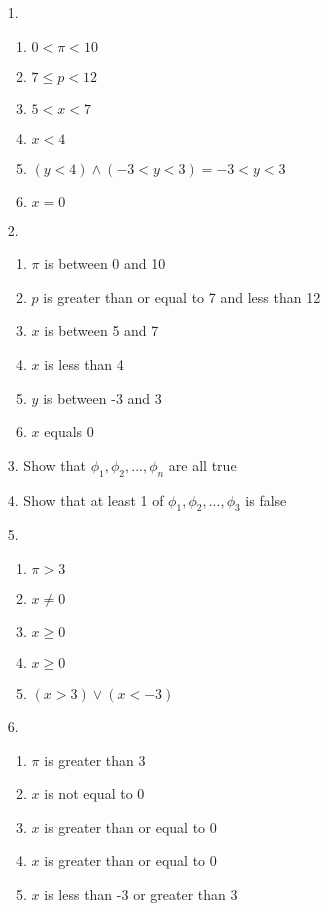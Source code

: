 \documentclass[11pt]{exam}
\author{@dante}
\begin{document}

\begin{enumerate}[leftmargin=0pt]

\item[1.]
\begin{enumerate}[label=(\alph*)]
    \item $0 < \pi < 10$
    \item $7 \leq p < 12$
    \item $5 < x < 7$
    \item $x < 4$
    \item $(y < 4) \land (-3 < y < 3) = -3 < y < 3$
    \item $x = 0$
\end{enumerate}

\item[2.]
\begin{enumerate}[label=(\alph*)]
    \item $\pi$ is between 0 and 10
    \item $p$ is greater than or equal to 7 and less than 12
    \item $x$ is between 5 and 7
    \item $x$ is less than 4
    \item $y$ is between -3 and 3
    \item $x$ equals 0
\end{enumerate}

\item[3.] Show that $\phi_1, \phi_2, ..., \phi_n$ are all true

\item[4.] Show that at least 1 of $\phi_1, \phi_2, ..., \phi_3$ is false

\item[5.] 
\begin{enumerate}[label=(\alph*)]
    \item $\pi > 3$
    \item $x \neq 0$
    \item $x \geq 0$
    \item $x \geq 0$
    \item $(x > 3) \lor (x < -3)$
\end{enumerate}

\item[6.]
\begin{enumerate}[label=(\alph*)]
    \item $\pi$ is greater than 3
    \item $x$ is not equal to 0
    \item $x$ is greater than or equal to 0
    \item $x$ is greater than or equal to 0
    \item $x$ is less than -3 or greater than 3
\end{enumerate}


\end{enumerate}
\end{document}
